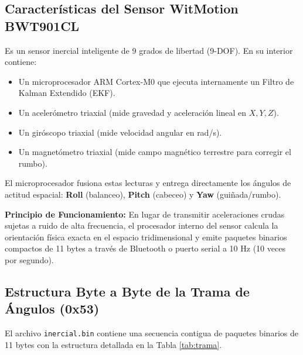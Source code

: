 \documentclass[12pt,letterpaper]{article}
\begin{document}
\subsection{Características del Sensor WitMotion BWT901CL}
Es un sensor inercial inteligente de 9 grados de libertad (9-DOF). En su interior contiene:
\begin{itemize}
    \item Un microprocesador ARM Cortex-M0 que ejecuta internamente un Filtro de Kalman Extendido (EKF).
    \item Un acelerómetro triaxial (mide gravedad y aceleración lineal en $X, Y, Z$).
    \item Un giróscopo triaxial (mide velocidad angular en rad/s).
    \item Un magnetómetro triaxial (mide campo magnético terrestre para corregir el rumbo).
\end{itemize}

El microprocesador fusiona estas lecturas y entrega directamente los ángulos de actitud espacial: \textbf{Roll} (balanceo), \textbf{Pitch} (cabeceo) y \textbf{Yaw} (guiñada/rumbo).

\begin{tcolorbox}[estudiobox, title=Principio de Fusión y Salida Sensorial]
\textbf{Principio de Funcionamiento:} En lugar de transmitir aceleraciones crudas sujetas a ruido de alta frecuencia, el procesador interno del sensor calcula la orientación física exacta en el espacio tridimensional y emite paquetes binarios compactos de 11 bytes a través de Bluetooth o puerto serial a 10 Hz (10 veces por segundo).
\end{tcolorbox}

\subsection{Estructura Byte a Byte de la Trama de Ángulos (0x53)}
El archivo \texttt{inercial.bin} contiene una secuencia contigua de paquetes binarios de 11 bytes con la estructura detallada en la Tabla \ref{tab:trama}.
\end{document}

